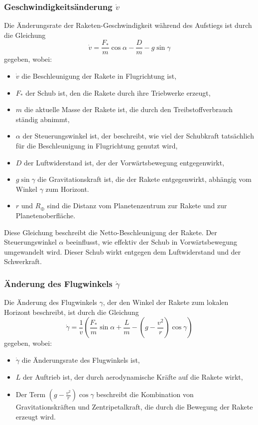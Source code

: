 \subsubsection{Geschwindigkeitsänderung \(\dot{v}\)}
Die Änderungsrate der Raketen-Geschwindigkeit während des Aufstiegs ist durch die Gleichung
\[
\dot{v} = \frac{F_*}{m} \cos \alpha - \frac{D}{m} - g \sin \gamma
\]
gegeben, wobei:
\begin{itemize}
	\item \(\dot{v}\) die Beschleunigung der Rakete in Flugrichtung ist,
	\item \(F_*\) der Schub ist, den die Rakete durch ihre Triebwerke erzeugt,
	\item \(m\) die aktuelle Masse der Rakete ist, die durch den Treibstoffverbrauch ständig abnimmt,
	\item \(\alpha\) der Steuerungswinkel ist, der beschreibt, wie viel der Schubkraft tatsächlich für die Beschleunigung in Flugrichtung genutzt wird,
	\item \(D\) der Luftwiderstand ist, der der Vorwärtsbewegung entgegenwirkt,
	\item \(g \sin \gamma\) die Gravitationskraft ist, die der Rakete entgegenwirkt, abhängig vom Winkel \(\gamma\) zum Horizont.
    \item \(r\) und \(R_{\oplus}\) sind die Distanz vom Planetenzentrum zur Rakete und zur Planetenoberfläche.
\end{itemize}
Diese Gleichung beschreibt die Netto-Beschleunigung der Rakete. Der Steuerungswinkel \(\alpha\) beeinflusst, wie effektiv der Schub in Vorwärtsbewegung umgewandelt wird. Dieser Schub wirkt entgegen dem Luftwiderstand und der Schwerkraft. 


\subsubsection{Änderung des Flugwinkels \(\dot{\gamma}\)}
Die Änderung des Flugwinkels \(\gamma\), der den Winkel der Rakete zum lokalen Horizont beschreibt, ist durch die Gleichung
\[
\dot{\gamma} = \frac{1}{v}\left( \frac{F_*}{m} \sin \alpha + \frac{L}{m} - \left(g - \frac{v^2}{r}\right) \cos \gamma \right)
\]
gegeben, wobei:
\begin{itemize}
	\item \(\dot{\gamma}\) die Änderungsrate des Flugwinkels ist,
	\item \(L\) der Auftrieb ist, der durch aerodynamische Kräfte auf die Rakete wirkt,
	\item Der Term \(\left(g - \frac{v^2}{r}\right) \cos \gamma\) beschreibt die Kombination von Gravitationskräften und Zentripetalkraft, die durch die Bewegung der Rakete erzeugt wird.
\end{itemize}

